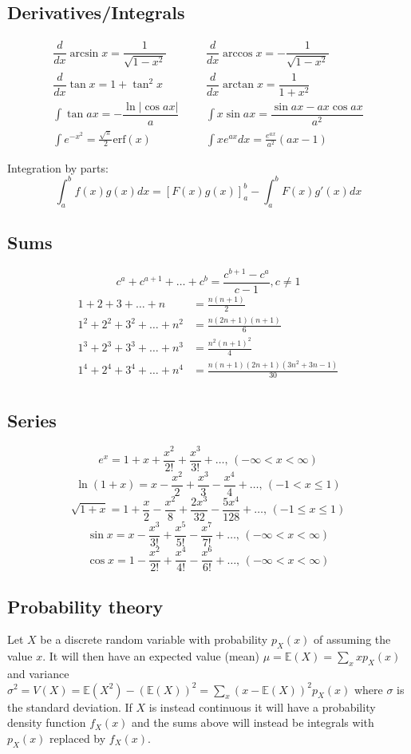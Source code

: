 \begin{multicols}{\Columns}
\subsection{Derivatives/Integrals}
\begin{align*}
	\dfrac{d}{dx}\arcsin x = \dfrac{1}{\sqrt{1-x^2}} &&& \dfrac{d}{dx}\arccos x = -\dfrac{1}{\sqrt{1-x^2}} \\
	\dfrac{d}{dx}\tan x = 1+\tan^2 x &&& \dfrac{d}{dx}\arctan x = \dfrac{1}{1+x^2} \\
	\int\tan ax = -\dfrac{\ln|\cos ax|}{a} &&& \int x\sin ax = \dfrac{\sin ax-ax \cos ax}{a^2} \\
	\int e^{-x^2} = \frac{\sqrt \pi}{2} \text{erf}(x) &&& \int xe^{ax}dx = \frac{e^{ax}}{a^2}(ax-1)
\end{align*}

Integration by parts:
\[\int_a^bf(x)g(x)dx = [F(x)g(x)]_a^b-\int_a^bF(x)g'(x)dx\]

\subsection{Sums}
\[ c^a + c^{a+1} + \dots + c^{b} = \frac{c^{b+1} - c^a}{c-1}, c \neq 1 \]
\begin{align*}
	1 + 2 + 3 + \dots + n &= \frac{n(n+1)}{2} \\
	1^2 + 2^2 + 3^2 + \dots + n^2 &= \frac{n(2n+1)(n+1)}{6} \\
	1^3 + 2^3 + 3^3 + \dots + n^3 &= \frac{n^2(n+1)^2}{4} \\
	1^4 + 2^4 + 3^4 + \dots + n^4 &= \frac{n(n+1)(2n+1)(3n^2 + 3n - 1)}{30} \\
\end{align*}

\subsection{Series}
$$e^x = 1+x+\frac{x^2}{2!}+\frac{x^3}{3!}+\dots,\,(-\infty<x<\infty)$$
$$\ln(1+x) = x-\frac{x^2}{2}+\frac{x^3}{3}-\frac{x^4}{4}+\dots,\,(-1<x\leq1)$$
$$\sqrt{1+x} = 1+\frac{x}{2}-\frac{x^2}{8}+\frac{2x^3}{32}-\frac{5x^4}{128}+\dots,\,(-1\leq x\leq1)$$
$$\sin x = x-\frac{x^3}{3!}+\frac{x^5}{5!}-\frac{x^7}{7!}+\dots,\,(-\infty<x<\infty)$$
$$\cos x = 1-\frac{x^2}{2!}+\frac{x^4}{4!}-\frac{x^6}{6!}+\dots,\,(-\infty<x<\infty)$$

\subsection{Probability theory}
Let $X$ be a discrete random variable with probability $p_X(x)$ of assuming the value $x$. It will then have an expected value (mean) $\mu=\mathbb{E}(X)=\sum_xxp_X(x)$ and variance $\sigma^2=V(X)=\mathbb{E}(X^2)-(\mathbb{E}(X))^2=\sum_x(x-\mathbb{E}(X))^2p_X(x)$ where $\sigma$ is the standard deviation. If $X$ is instead continuous it will have a probability density function $f_X(x)$ and the sums above will instead be integrals with $p_X(x)$ replaced by $f_X(x)$.


\end{multicols}
